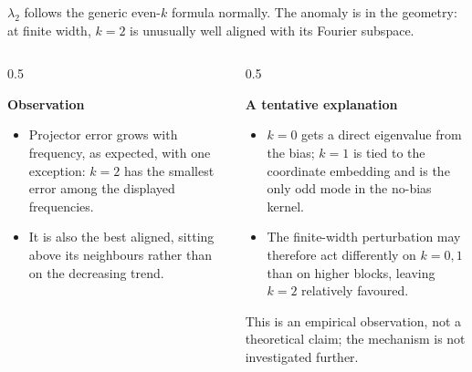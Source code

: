 \documentclass[aspectratio=169,9pt]{beamer}
\begin{document}
\begin{frame}[noframenumbering]
	{\textcolor{muted}{$\lambda_2$ follows the generic even-$k$ formula normally. The anomaly is in the geometry: at finite width, $k=2$ is unusually well aligned with its Fourier subspace.}}

	\vspace{2mm}
	\begin{columns}[T,onlytextwidth]
		\begin{column}{0.5\textwidth}
			\begin{whitecard}[height=40mm]
				{\scriptsize\bfseries Observation}\par\vspace{1mm}
				\begin{itemize}\tightlist\scriptsize
					\item Projector error grows with frequency, as expected, with one exception: $k=2$ has the smallest error among the displayed frequencies.
					\item It is also the best aligned, sitting above its neighbours rather than on the decreasing trend.
				\end{itemize}
			\end{whitecard}
		\end{column}
		\begin{column}{0.5\textwidth}
			\begin{bluecard}[height=40mm]
				{\scriptsize\bfseries A tentative explanation}\par\vspace{1mm}
				\begin{itemize}\tightlist\scriptsize
					\item $k=0$ gets a direct eigenvalue from the bias; $k=1$ is tied to the coordinate embedding and is the only odd mode in the no-bias kernel.
					\item The finite-width perturbation may therefore act differently on $k=0,1$ than on higher blocks, leaving $k=2$ relatively favoured.
				\end{itemize}
				\vspace{0.5mm}
				{\tiny\textcolor{muted}{This is an empirical observation, not a theoretical claim; the mechanism is not investigated further.}}
			\end{bluecard}
		\end{column}
	\end{columns}
\end{frame}
\end{document}
